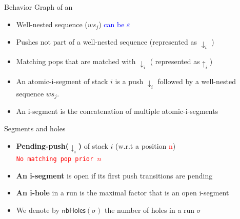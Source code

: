 \documentclass{beamer}
\newcommand{\nbholes}[1]{\mathsf{nbHoles}(#1)}
\begin{document}
 \begin{frame}{Behavior Graph of an \mpda{}}
 
 \pause
  
  
   \begin{itemize}[<+->]
   \item Well-nested sequence ($ws_{j}$) \textcolor{blue}{ can be
       $\varepsilon$}
     \item Pushes not part of a well-nested sequence (represented as
       $\downarrow_i$ )
        \item Matching pops that are matched with $\downarrow_i$ ( represented
          as$\uparrow_{i}$) 
     \item An atomic-i-segment of stack $i$ is a push $\downarrow_i$ followed by a
       well-nested sequence $ws_{j}$.
   \item An i-segment is the concatenation of multiple
     atomic-i-segments 
   
   \end{itemize}
\end{frame}
 \begin{frame}[t]{ Segments and holes}
    
   \begin{itemize}[<+->]
 
   \item \textbf{Pending-push($\downarrow_{i}$)} of stack $i$ (w.r.t
     a position \textcolor{red}{n}) \\
 \textcolor{red}{  \texttt{No matching pop prior  $n$ }}
     
  \item \textbf{An i-segment} is open if its first push transitions are
    pending
    \item \textbf{An i-hole} in a run is the maximal factor that is an open
      i-segment 
     \item  We denote by $\nbholes{\sigma}$ the number of holes in a run $\sigma$

      
    
     
  
     
   \end{itemize}
 \end{frame}
\end{document}
